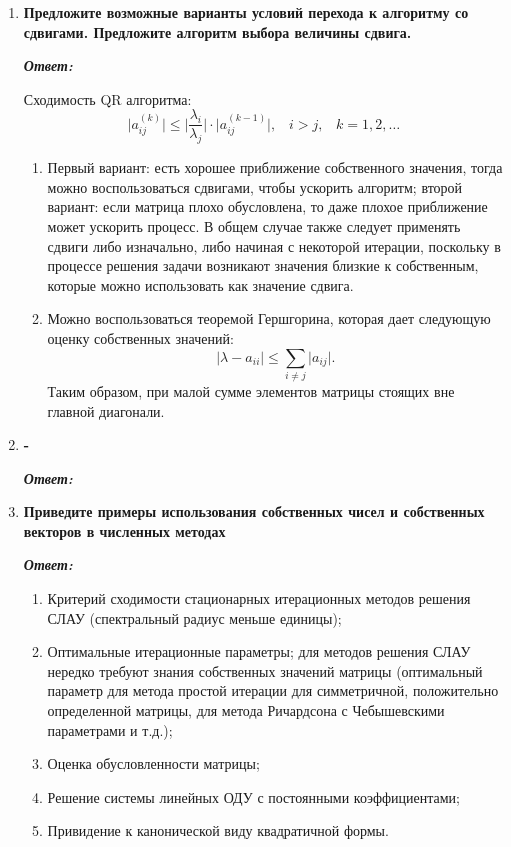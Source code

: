 \documentclass[12pt, a4paper]{article}
\newcommand{\abs}[1]{\lvert #1 \rvert}
\begin{document}
\begin{enumerate}
	\item \textbf{ Предложите возможные варианты условий перехода к алгоритму со сдвигами. Предложите алгоритм выбора величины сдвига.}
	\vspace*{0.2cm}
	
	\textit{\textbf{Ответ:}}
	
	Сходимость QR алгоритма:
	\[
	\abs{a_{ij}^{(k)}} \le \abs{\dfrac{\lambda_i}{\lambda_j}}\cdot \abs{a_{ij}^{(k-1)}}, \;\;\; i > j, \;\;\; k = 1, 2, \ldots
	\]
	\begin{enumerate}
		\item
		Первый вариант: есть хорошее приближение собственного значения, тогда можно воспользоваться сдвигами, чтобы ускорить алгоритм; второй вариант: если матрица плохо обусловлена, то даже плохое приближение может ускорить процесс. В общем случае также следует применять сдвиги либо изначально, либо начиная с некоторой итерации, поскольку в процессе решения задачи возникают значения близкие к собственным, которые можно использовать как значение сдвига.  
		
		\item Можно воспользоваться теоремой Гершгорина, которая дает следующую оценку собственных значений:
		\[
		\abs{\lambda - a_{ii}} \le \sum\limits_{i \neq j}\abs{a_{ij}}.
		\] 
		Таким образом, при малой сумме элементов матрицы стоящих вне главной диагонали. 
	\end{enumerate}
	
	
	\item \textbf{-}
	\vspace*{0.2cm}
	
	\textit{\textbf{Ответ:}}
	
	\item \textbf{Приведите примеры использования собственных чисел и собственных векторов в численных методах}
	\vspace*{0.2cm}
	
	\textit{\textbf{Ответ:}}
	\begin{enumerate}
		\item Критерий сходимости стационарных итерационных методов решения СЛАУ (спектральный радиус меньше единицы); 
		\item Оптимальные итерационные параметры; для методов решения СЛАУ нередко требуют знания собственных значений матрицы (оптимальный параметр для метода простой итерации для симметричной, положительно определенной матрицы, для метода Ричардсона с Чебышевскими параметрами и т.д.);
		\item Оценка обусловленности матрицы;
		\item Решение системы линейных ОДУ с постоянными коэффициентами; 
		\item Привидение к канонической виду квадратичной формы. 
	\end{enumerate}
	
	\end{enumerate}
\end{document}
